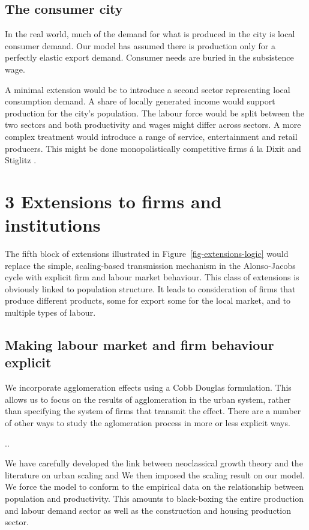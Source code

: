 \subsection{The consumer city}
In the real world, much of the demand for what is produced in the city is local consumer demand.  Our model has assumed there is production only for a perfectly elastic export demand. Consumer needs are buried in the subsistence wage. 

A minimal extension would be to introduce a second sector representing local consumption demand. A share of locally generated income would support production for the city's population. The labour force would be split between the two sectors and both productivity and wages might differ across sectors. 
A more complex treatment would introduce a range of service, entertainment and retail producers. This might be done monopolistically competitive firms \'a la Dixit and Stiglitz \cite{AvinashK.Dixit1977MCaO}.



\section{3 Extensions to firms and institutions} %
The fifth block of extensions illustrated in Figure~\ref{fig-extensions-logic} would replace the simple, scaling-based transmission mechanism in the Alonso-Jacobs cycle with explicit firm and labour market behaviour. This class of extensions is obviously linked to population structure. It leads to consideration of firms that produce different products, some for export some for the local market, and to multiple types of labour.

\subsection{Making labour market and firm behaviour explicit}

We incorporate agglomeration effects using a Cobb Douglas formulation. This allows us to focus on the results of agglomeration in the urban system, rather than specifying the system of firms that transmit the effect. 
There are a number of other ways to study the aglomeration process in more or less explicit ways.

..

We have carefully developed the link between neoclassical growth theory and the literature on urban scaling \cite{bettencourtIntroductionUrbanScience2021} and  We then imposed the scaling result on our model.  We force the model to conform to the empirical data on the relationship between population and productivity. This amounts to black-boxing the entire production and labour demand sector as well as the construction and housing production sector. 

